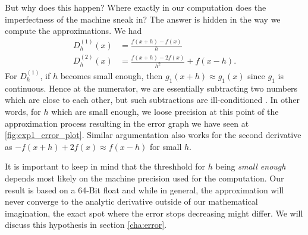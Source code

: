 But why does this happen? Where exactly in our computation does the imperfectness of the machine sneak in? The answer is hidden in the way we compute the approximations. We had
\begin{align*}
    D^{(1)}_h(x) &= \frac{f(x + h) - f(x)}{h} \\
    D^{(2)}_h(x) &= \frac{f(x + h) - 2 f(x)}{h^2} + f(x - h) \text{.}
\end{align*}
For \(D^{(1)}_h\), if \(h\) becomes small enough, then \(g_1(x + h) \approx g_1(x)\) since \(g_1\) is continuous. Hence at the numerator, we are essentially subtracting two numbers which are close to each other, but such subtractions are ill-conditioned \cite{Lecture}. In other words, for \(h\) which are small enough, we loose precision at this point of the approximation process resulting in the error graph we have seen at \ref{fig:exp1_error_plot}. Similar argumentation also works for the second derivative as \(- f(x + h) + 2 f(x) \approx f(x - h)\) for small \(h\).

It is important to keep in mind that the threshhold for \(h\) being \textit{small enough} depends most likely on the machine precision used for the computation. Our result is based on a 64-Bit float and while in general, the approximation will never converge to the analytic derivative outside of our mathematical imagination, the exact spot where the error stops decreasing might differ. We will discuss this hypothesis in section \ref{cha:error}.